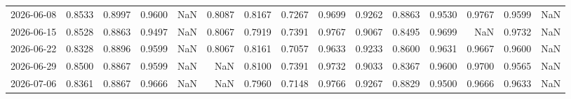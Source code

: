\begin{table}
\begin{tabular}{lrrrrrrrrrrrrrr}
2026-06-08 & 0.8533 & 0.8997 & 0.9600 & NaN & 0.8087 & 0.8167 & 0.7267 & 0.9699 & 0.9262 & 0.8863 & 0.9530 & 0.9767 & 0.9599 & NaN \\
2026-06-15 & 0.8528 & 0.8863 & 0.9497 & NaN & 0.8067 & 0.7919 & 0.7391 & 0.9767 & 0.9067 & 0.8495 & 0.9699 & NaN & 0.9732 & NaN \\
2026-06-22 & 0.8328 & 0.8896 & 0.9599 & NaN & 0.8067 & 0.8161 & 0.7057 & 0.9633 & 0.9233 & 0.8600 & 0.9631 & 0.9667 & 0.9600 & NaN \\
2026-06-29 & 0.8500 & 0.8867 & 0.9599 & NaN & NaN & 0.8100 & 0.7391 & 0.9732 & 0.9033 & 0.8367 & 0.9600 & 0.9700 & 0.9565 & NaN \\
2026-07-06 & 0.8361 & 0.8867 & 0.9666 & NaN & NaN & 0.7960 & 0.7148 & 0.9766 & 0.9267 & 0.8829 & 0.9500 & 0.9666 & 0.9633 & NaN \\
\bottomrule
\end{tabular}
\end{table}
